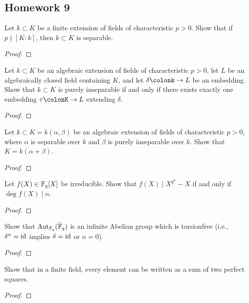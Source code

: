 \subsection{Homework 9}
\begin{problem}
  Let $k\subset K$ be a finite extension of fields of characteristic
  $p>0$. Show that if $p\nmid[K:k]$, then $k\subset K$ is separable.
\end{problem}
\begin{proof}
\end{proof}

\begin{problem}
  Let $k\subset K$ be an algebraic extension of fields of characteristic
  $p>0$, let $L$ be an algebraically closed field containing $K$, and let
  $\delta\colonk\to L$ be an embedding. Show that $k\subset K$ is purely
  inseparable if and only if there exists exactly one embedding
  $\tau\colonK\to L$ extending $\delta$.
\end{problem}
\begin{proof}
\end{proof}

\begin{problem}
  Let $k\subset K=k(\alpha,\beta)$ be an algebraic extension of fields of
  characteristic $p>0$, where $\alpha$ is separable over $k$ and $\beta$ is
  purely inseparable over $k$. Show that $K=k(\alpha+\beta)$.
\end{problem}
\begin{proof}
\end{proof}

\begin{problem}
  Let $f(X)\in\mathbb{F}_q[X]$ be irreducible. Show that $f(X)\mid X^{q^n}-X$ if
  and only if $\deg f(X)\mid n$.
\end{problem}
\begin{proof}
\end{proof}

\begin{problem}
  Show that $\operatorname{Aut}_{\mathbb{F}_q}(\bar{\mathbb{F}}_q)$ is an infinite Abelian group which
  is torsionfree (i.e., $\delta^n=\operatorname{id}$ implies $\delta=\operatorname{id}$ or $n=0$).
\end{problem}
\begin{proof}
\end{proof}

\begin{problem}
  Show that in a finite field, every element can be written as a sum of two
  perfect squares.
\end{problem}
\begin{proof}
\end{proof}

